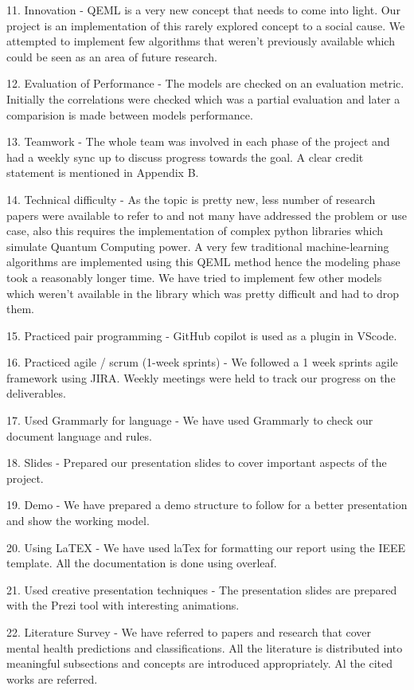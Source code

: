 \documentclass[10pt,journal,compsoc]{IEEEtran}
\begin{document}
11. Innovation - QEML is a very new concept that needs to come into light. Our project is an implementation of this rarely explored concept to a social cause. We attempted to implement few algorithms that weren't previously available which could be seen as an area of future research.

12. Evaluation of Performance - The models are checked on an evaluation metric. Initially the correlations were checked which was a partial evaluation and later a comparision is made between models performance.

13. Teamwork - The whole team was involved in each phase of the project and had a weekly sync up to discuss progress towards the goal. A clear credit statement is mentioned in Appendix B.

14. Technical difficulty - As the topic is pretty new, less number of research papers were available to refer to and not many have addressed the problem or use case, also this requires the implementation of complex python libraries which simulate Quantum Computing power. A very few traditional machine-learning algorithms are implemented using this QEML method hence the modeling phase took a reasonably longer time. We have tried to implement few other models which weren't available in the library which was pretty difficult and had to drop them.

15. Practiced pair programming - GitHub copilot is used as a plugin in VScode.

16. Practiced agile / scrum (1-week sprints) - We followed a 1 week sprints agile framework using JIRA. Weekly meetings were held to track our progress on the deliverables.

17. Used Grammarly for language - We have used Grammarly to check our document language and rules.

18. Slides - Prepared our presentation slides to cover important aspects of the project.

19. Demo - We have prepared a demo structure to follow for a better presentation and show the working model.

20. Using LaTEX - We have used laTex for formatting our report using the IEEE template. All the documentation is done using overleaf.

21. Used creative presentation techniques - The presentation slides are prepared with the Prezi tool with interesting animations.

22. Literature Survey - We have referred to papers and research that cover mental health predictions and classifications. All the literature is distributed into meaningful subsections and concepts are introduced appropriately. Al the cited works are referred.
\end{document}
